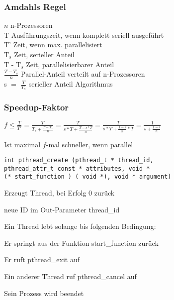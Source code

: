 \begin{multicols*}{5}
	
	\subsubsection{Amdahls Regel}
	$n$ n-Prozessoren\\
	T Ausführungszeit, wenn komplett seriell ausgeführt\\
	T' Zeit, wenn max. parallelisiert\\
	T$_{s}$ Zeit, serieller Anteil\\
	T - T$_{s}$ Zeit, parallelisierbarer Anteil\\
	$\frac{T - T_{s}}{n}$  Parallel-Anteil verteilt auf n-Prozessoren\\
	s $=$ $\frac{T}{T_{s}}$ serieller Anteil Algorithmus
	
	\subsubsection{Speedup-Faktor}
	$f \leq \frac{T}{T'} = \frac{T}{T_{s} + \frac{T - T_s}{n}} = \frac{T}{s * T + \frac{T - s * T}{n}} = \frac{T}{s * T + \frac{1 - s}{n} * T} = \frac{1}{s + \frac{1 - s}{n}}$

	Ist maximal $f$-mal schneller, wenn parallel




	\begin{lstlisting}
int pthread_create (pthread_t * thread_id, 
pthread_attr_t const * attributes, void * 
(* start_function ) ( void *), void * argument)
	\end{lstlisting}
	\vspace{-6pt}
	\begin{compactitem}[$\bullet$]
		\item Erzeugt Thread, bei Erfolg 0 zurück
		\item neue ID im Out-Parameter thread\_id
	\end{compactitem}
	
	\vspace{-2pt}
	\drule{\linewidth}{1pt}

	Ein Thread \textcolor{h}{lebt solange bis} folgenden Bedingung:
		\begin{compactitem}[$\bullet$]
			\item Er springt aus der Funktion start\_function zurück
			\item Er ruft pthread\_exit auf
			\item Ein anderer Thread ruf pthread\_cancel auf
			\item Sein Prozess wird beendet
		\end{compactitem}


\end{multicols*}
